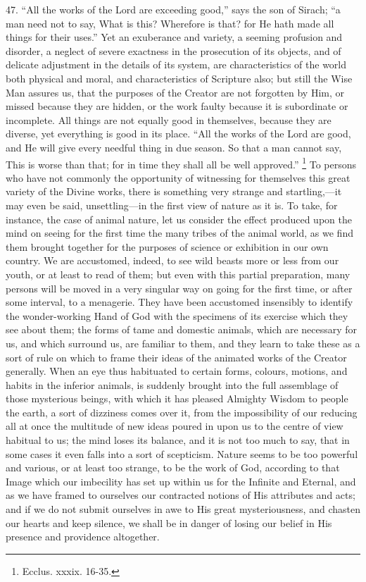 47. ``All
the works of the Lord are exceeding good,'' says the son of Sirach; ``a
man need not to say, What is this? Wherefore is that? for He hath made
all things for their uses.'' Yet an exuberance and variety, a seeming
profusion and disorder, a neglect of severe exactness in the
prosecution of its objects, and of delicate adjustment in the details
of its system, are characteristics of the world both physical and
moral, and characteristics of Scripture also; but still the Wise Man
assures us, that the purposes of the Creator are not forgotten by Him,
or missed because they are hidden, or the work faulty because it is
subordinate or incomplete. All things are not equally good in
themselves, because they are diverse, yet everything is good in its
place. ``All the works of the Lord are good, and He will give every
needful thing in due season. So that a man cannot say, This is
worse than that; for in time they shall all be well approved.'' \footnote{Ecclus. xxxix. 16-35.} To persons who have not commonly the opportunity of witnessing for
themselves this great variety of the Divine works, there is something
very strange and startling,—it may even be said, unsettling—in the
first view of nature as it is. To take, for instance, the case of
animal nature, let us consider the effect produced upon the mind on
seeing for the first time the many tribes of the animal world, as we
find them brought together for the purposes of science or exhibition
in our own country. We are accustomed, indeed, to see wild beasts more
or less from our youth, or at least to read of them; but even with
this partial preparation, many persons will be moved in a very
singular way on going for the first time, or after some interval, to a
menagerie. They have been accustomed insensibly to identify the
wonder-working Hand of God with the specimens of its exercise which
they see about them; the forms of tame and domestic animals, which are
necessary for us, and which surround us, are familiar to them, and
they learn to take these as a sort of rule on which to frame their
ideas of the animated works of the Creator generally. When an eye thus
habituated to certain forms, colours, motions, and habits in the
inferior animals, is suddenly brought into the full assemblage of
those mysterious beings, with which it has pleased Almighty
Wisdom to people the earth, a sort of dizziness comes over it, from
the impossibility of our reducing all at once the multitude of new
ideas poured in upon us to the centre of view habitual to us; the mind
loses its balance, and it is not too much to say, that in some cases
it even falls into a sort of scepticism. Nature seems to be too
powerful and various, or at least too strange, to be the work of God,
according to that Image which our imbecility has set up within us for
the Infinite and Eternal, and as we have framed to ourselves our
contracted notions of His attributes and acts; and if we do not submit
ourselves in awe to His great mysteriousness, and chasten our hearts
and keep silence, we shall be in danger of losing our belief in His
presence and providence altogether.

